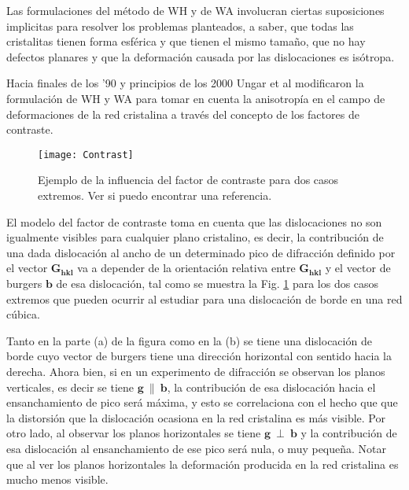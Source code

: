 Las formulaciones del método de WH y de WA involucran ciertas suposiciones implicitas para resolver los problemas planteados, a saber, que todas las cristalitas tienen forma esférica y que tienen el mismo tamaño, que no hay defectos planares y que la deformación causada por las dislocaciones es isótropa. 

Hacia finales de los '90 y principios de los 2000 Ungar et al modificaron la formulación de WH y WA para tomar en cuenta la anisotropía en el campo de deformaciones de la red cristalina a través del concepto de los factores de contraste.

\begin{figure}[!htb]
  \centering
  \texttt{[image: Contrast]}
  \caption{Ejemplo de la influencia del factor de contraste para dos casos extremos. Ver si puedo encontrar una referencia.}
  \label{fig:contrast}
\end{figure}

El modelo del factor de contraste toma en cuenta que las dislocaciones no son igualmente visibles para cualquier plano cristalino, es decir, la contribución de una dada dislocación al ancho de un determinado pico de difracción definido por el vector $\mathbf{G_{hkl}}$ va a depender de la orientación relativa entre $\mathbf{G_{hkl}}$ y el vector de burgers $\mathbf{b}$ de esa dislocación, tal como se muestra la Fig. \ref{fig:contrast} para los dos casos extremos que pueden ocurrir al estudiar para una dislocación de borde en una red cúbica.

Tanto en la parte (a) de la figura como en la (b) se tiene una dislocación de borde cuyo vector de burgers tiene una dirección horizontal con sentido hacia la derecha. 
Ahora bien, si en un experimento de difracción se observan los planos verticales, es decir se tiene $\mathbf{g} \ \parallel \ \mathbf{b}$, la contribución de esa dislocación hacia el ensanchamiento de pico será máxima, y esto se correlaciona con el hecho que que la distorsión que la dislocación ocasiona en la red cristalina es más visible.
Por otro lado, al observar los planos horizontales se tiene $\mathbf{g} \ \perp \ \mathbf{b}$ y la contribución de esa dislocación al ensanchamiento de ese pico será nula, o muy pequeña.
Notar que al ver los planos horizontales la deformación producida en la red cristalina es mucho menos visible.


